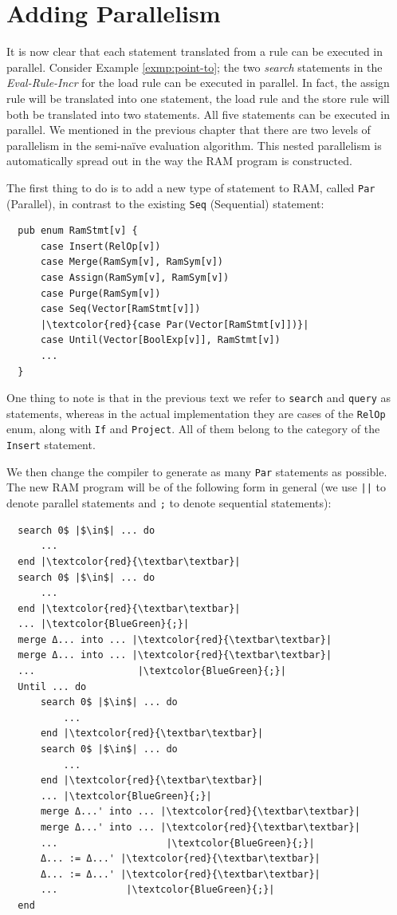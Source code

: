 \documentclass[twoside,11pt,openright]{report}
\theoremstyle{definition}
\begin{document}
\section{Adding Parallelism}

It is now clear that each statement translated from a rule can be executed in parallel. Consider Example \ref{exmp:point-to}; the two \textit{search} statements in the \textit{Eval-Rule-Incr} for the load rule can be executed in parallel. In fact, the assign rule will be translated into one statement, the load rule and the store rule will both be translated into two statements. All five statements can be executed in parallel. We mentioned in the previous chapter that there are two levels of parallelism in the semi-naïve evaluation algorithm. This nested parallelism is automatically spread out in the way the RAM program is constructed.

The first thing to do is to add a new type of statement to RAM, called \texttt{Par} (Parallel), in contrast to the existing \texttt{Seq} (Sequential) statement:

\begin{verbatim}
  pub enum RamStmt[v] {
      case Insert(RelOp[v])
      case Merge(RamSym[v], RamSym[v])
      case Assign(RamSym[v], RamSym[v])
      case Purge(RamSym[v])
      case Seq(Vector[RamStmt[v]])
      |\textcolor{red}{case Par(Vector[RamStmt[v]])}|
      case Until(Vector[BoolExp[v]], RamStmt[v])
      ...
  }
\end{verbatim}

One thing to note is that in the previous text we refer to \texttt{search} and \texttt{query} as statements, whereas in the actual implementation they are cases of the \texttt{RelOp} enum, along with \texttt{If} and \texttt{Project}. All of them belong to the category of the \texttt{Insert} statement.

We then change the compiler to generate as many \texttt{Par} statements as possible. The new RAM program will be of the following form in general (we use \texttt{||} to denote parallel statements and \texttt{;} to denote sequential statements):

\begin{verbatim}
  search 0$ |$\in$| ... do
      ...
  end |\textcolor{red}{\textbar\textbar}|
  search 0$ |$\in$| ... do
      ...
  end |\textcolor{red}{\textbar\textbar}|
  ... |\textcolor{BlueGreen}{;}|
  merge Δ... into ... |\textcolor{red}{\textbar\textbar}|
  merge Δ... into ... |\textcolor{red}{\textbar\textbar}|
  ...                  |\textcolor{BlueGreen}{;}|
  Until ... do
      search 0$ |$\in$| ... do
          ...
      end |\textcolor{red}{\textbar\textbar}|
      search 0$ |$\in$| ... do
          ...
      end |\textcolor{red}{\textbar\textbar}|
      ... |\textcolor{BlueGreen}{;}|
      merge Δ...' into ... |\textcolor{red}{\textbar\textbar}|
      merge Δ...' into ... |\textcolor{red}{\textbar\textbar}|
      ...                   |\textcolor{BlueGreen}{;}|
      Δ... := Δ...' |\textcolor{red}{\textbar\textbar}|
      Δ... := Δ...' |\textcolor{red}{\textbar\textbar}|
      ...            |\textcolor{BlueGreen}{;}|
  end 
\end{verbatim}
\end{document}
